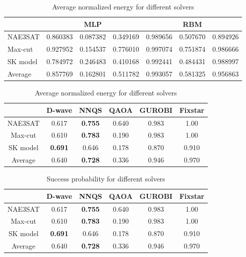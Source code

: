\begin{table}[!ht]
    \centering
    \begin{tabular}{|l|l|l|l|l|l|l}
        \hline
            ~ & \multicolumn{3}{c}{MLP} & \multicolumn{3}{c}{RBM}  \\ \hline
            NAE3SAT & 0.860383 & 0.087382 & 0.349169 & 0.989656 & 0.507670 & 0.894926 \\ \hline
            Max-cut & 0.927952 & 0.154537 & 0.776010 & 0.997074 & 0.751874 & 0.986666 \\ \hline
            SK model & 0.784972 & 0.246483 & 0.410168 & 0.992441 & 0.484431 & 0.988997 \\ \hline
            Average & 0.857769 & 0.162801 & 0.511782 & 0.993057 & 0.581325 & 0.956863 \\ \hline
        \end{tabular}
    \caption{Average normalized energy for different solvers}
    \label{results:allnormalizedenergy}
\end{table}


\begin{table}[!ht]
    \centering
    \begin{tabular}{cccccc} \toprule
        ~ & D-wave & NNQS & QAOA & GUROBI & Fixstar \\ \midrule
        NAE3SAT & 0.617 & \textbf{0.755} & 0.640 & 0.983 & 1.00 \\
        Max-cut & 0.610 & \textbf{0.783} & 0.190 & 0.983 & 1.00 \\
        SK model & \textbf{0.691} & 0.646 & 0.178 & 0.870 & 0.910 \\ \midrule
        Average & 0.640 & \textbf{0.728} & 0.336 & 0.946 & 0.970 \\ \bottomrule
    \end{tabular}
    \caption{Average normalized energy for different solvers}
    \label{results:nnqsnormalizedenergy}
\end{table}

\begin{table}[!ht]
    \centering
    \begin{tabular}{cccccc} \toprule
        ~ & D-wave & NNQS & QAOA & GUROBI & Fixstar \\ \midrule
        NAE3SAT & 0.617 & \textbf{0.755} & 0.640 & 0.983 & 1.00 \\
        Max-cut & 0.610 & \textbf{0.783} & 0.190 & 0.983 & 1.00 \\
        SK model & \textbf{0.691} & 0.646 & 0.178 & 0.870 & 0.910 \\ \midrule
        Average & 0.640 & \textbf{0.728} & 0.336 & 0.946 & 0.970 \\ \bottomrule
    \end{tabular}
\caption{Success probability for different solvers}
\label{results:nnqssuccess}
\end{table}